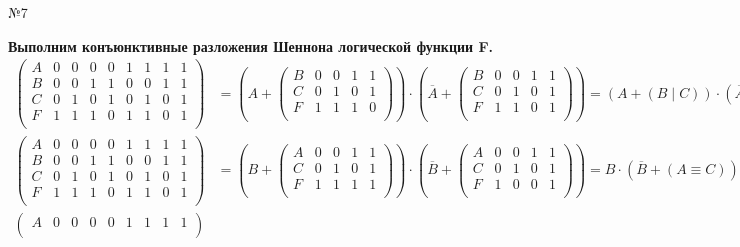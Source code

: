 \documentclass[]{article}
\begin{document}
	\newpage
	\begin{center}\begin{large}{№7}\end{large}\end{center}
	\textbf{Выполним конъюнктивные разложения Шеннона логической функции F.}
	\[
	\begin{aligned}
		\begin{pmatrix}
			A&0&0&0&0&1&1&1&1\\
			B&0&0&1&1&0&0&1&1\\
			C&0&1&0&1&0&1&0&1\\
			F&1&1&1&0&1&1&0&1\\
		\end{pmatrix}
		&=\left(A+
		\begin{pmatrix}
			B&0&0&1&1\\
			C&0&1&0&1\\
			F&1&1&1&0\\
		\end{pmatrix}
		\right)
		\cdot \left(\overline{A}+
		\begin{pmatrix}
			B&0&0&1&1\\
			C&0&1&0&1\\
			F&1&1&0&1\\
		\end{pmatrix}\right)
		=(A + (B\mid C))\cdot (\overline{A} + (B\Rightarrow C) )
		\\
		\begin{pmatrix}
		A&0&0&0&0&1&1&1&1\\
		B&0&0&1&1&0&0&1&1\\
		C&0&1&0&1&0&1&0&1\\
		F&1&1&1&0&1&1&0&1\\
		\end{pmatrix}
		&=\left(B+
		\begin{pmatrix}
		A&0&0&1&1\\
		C&0&1&0&1\\
		F&1&1&1&1\\
		\end{pmatrix}
		\right)
		\cdot \left(\overline{B}+
		\begin{pmatrix}
		A&0&0&1&1\\
		C&0&1&0&1\\
		F&1&0&0&1\\
		\end{pmatrix}\right)
		=B\cdot(\overline{B}+ (A\equiv C)) 
		\\
		\begin{pmatrix}
		A&0&0&0&0&1&1&1&1\\

\end{pmatrix}
\end{aligned}\]
\end{document}
